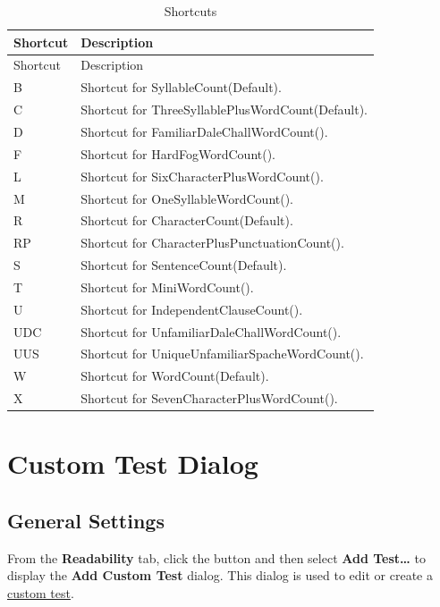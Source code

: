 \documentclass[
]{book}
\theoremstyle{definition}
\theoremstyle{definition}
\theoremstyle{definition}
\theoremstyle{definition}
\theoremstyle{remark}
\begin{document}
\begin{minipage}{\textwidth}

\begin{longtable}[]{@{}ll@{}}
\caption{Shortcuts}\tabularnewline
\toprule
Shortcut & Description \\
\midrule
\endfirsthead
\toprule
Shortcut & Description \\
\midrule
\endhead
B & Shortcut for SyllableCount(Default). \\
C & Shortcut for ThreeSyllablePlusWordCount(Default). \\
D & Shortcut for FamiliarDaleChallWordCount(). \\
F & Shortcut for HardFogWordCount(). \\
L & Shortcut for SixCharacterPlusWordCount(). \\
M & Shortcut for OneSyllableWordCount(). \\
R & Shortcut for CharacterCount(Default). \\
RP & Shortcut for CharacterPlusPunctuationCount(). \\
S & Shortcut for SentenceCount(Default). \\
T & Shortcut for MiniWordCount(). \\
U & Shortcut for IndependentClauseCount(). \\
UDC & Shortcut for UnfamiliarDaleChallWordCount(). \\
UUS & Shortcut for UniqueUnfamiliarSpacheWordCount(). \\
W & Shortcut for WordCount(Default). \\
X & Shortcut for SevenCharacterPlusWordCount(). \\
\bottomrule
\end{longtable}

\end{minipage}

\hypertarget{custom-test-dialog}{%
\section{Custom Test Dialog}\label{custom-test-dialog}}

\hypertarget{custom-test-general-settings}{%
\subsection*{General Settings}\label{custom-test-general-settings}}

From the \textbf{Readability} tab, click the  button and then select \textbf{Add Test\ldots{}} to display the \textbf{Add Custom Test} dialog. This dialog is used to edit or create a \protect\hyperlink{creating-custom-test}{custom test}.
\end{document}

